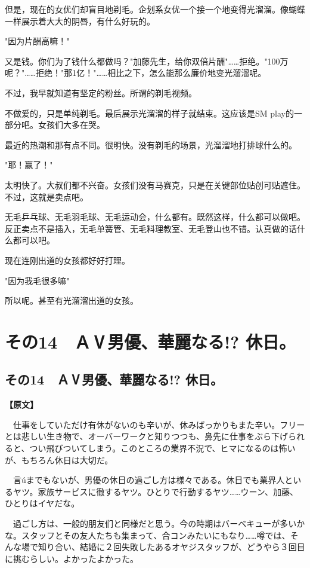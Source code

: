 \documentclass[12pt,UTF8]{ctexbook}
\begin{document}
{{但是，现在的女优们却盲目地剃毛。企划系女优一个接一个地变得光溜溜。像蝴蝶一样展示着大大的阴唇，有什么好玩的。

"因为片酬高嘛！"

又是钱。你们为了钱什么都做吗？"加藤先生，给你双倍片酬"……拒绝。"100万呢？"……拒绝！"那1亿！"……相比之下，怎么能那么廉价地变光溜溜呢。

不过，我早就知道有坚定的粉丝。所谓的剃毛视频。

不做爱的，只是单纯剃毛。最后展示光溜溜的样子就结束。这应该是SM play的一部分吧。女孩们大多在哭。

最近的热潮和那有点不同。很明快。没有剃毛的场景，光溜溜地打排球什么的。

"耶！赢了！"

太明快了。大叔们都不兴奋。女孩们没有马赛克，只是在关键部位贴创可贴遮住。不过，这就是卖点吧。

无毛乒乓球、无毛羽毛球、无毛运动会，什么都有。既然这样，什么都可以做吧。反正卖点不是插入，无毛单簧管、无毛料理教室、无毛登山也不错。认真做的话什么都可以吧。

现在连刚出道的女孩都好好打理。

"因为我毛很多嘛"

所以呢。甚至有光溜溜出道的女孩。
}

\chapter{その14　ＡⅤ男優、華麗なる!? 休日。}
\label{chap:14}
\section{その14　ＡⅤ男優、華麗なる!? 休日。}

\vspace{1ex}
\parbox{0.9\linewidth}{
\textbf{【原文】}\par

　仕事をしていただけ有休がないのも辛いが、休みばっかりもまた辛い。フリーとは悲しい生き物で、オーバーワークと知りつつも、鼻先に仕事をぶら下げられると、つい飛びついてしまう。このところの業界不況で、ヒマになるのは怖いが、もちろん休日は大切だ。

　言úまでもないが、男優の休日の過ごし方は様々である。休日でも業界人といるヤツ。家族サービスに徹するヤツ。ひとりで行動するヤツ……ウーン、加藤、ひとりはイヤだな。

　過ごし方は、一般的朋友们と同様だと思う。今の時期はバーベキューが多いかな。スタッフとその友人たちも集まって、合コンみたいにもなり……噂では、そんな場で知り合い、結婚に２回失敗したあるオヤジスタッフが、どうやら３回目に挑むらしい。よかったよかった。

}}
\end{document}
